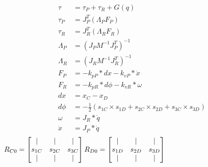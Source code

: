 \documentclass[10pt,a4paper,notitlepage]{report}
\begin{document}
\begin{align*}
\tau &= \tau_{P}+\tau_{R}+G(q) \\
\tau_{P} &= J^{T}_{P}(\Lambda_{P}F_{P})\\
\tau_{R} &= J^{T}_{R}(\Lambda_{R}F_{R})\\
\Lambda_{P} &= (J_{P}M^{-1}J_{P}^{T})^{-1}\\
\Lambda_{R} &= (J_{R}M^{-1}J_{R}^{T})^{-1} \\
F_{P} &= -k_{pP}*dx - k_{vP}*\dot{x}\\
F_{R} &= -k_{pR}*d\phi - k_{vR}*\omega  \\
dx &= x_{C} - x_{D}\\
d\phi &= -\frac{1}{2}(s_{1C}\times s_{1D}+s_{2C}\times s_{2D}+s_{3C}\times s_{3D})\\
\omega &= J_{R}*\dot{q}\\
\dot{x} &= J_{P}*\dot{q}\\
\end{align*}
$R_{C0} = 
\begin{bmatrix}
\vert & \vert & \vert\\
s_{1C} & s_{2C} & s_{3C}\\
\vert & \vert & \vert\\
\end{bmatrix}\\
R_{D0} = 
\begin{bmatrix}
\vert & \vert & \vert\\
s_{1D} & s_{2D} & s_{3D}\\
\vert & \vert & \vert\\
\end{bmatrix}
$
\end{document}
